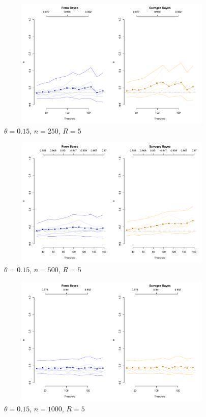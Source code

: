 \documentclass[12pt]{article}
\begin{document}
\begin{figure}
\begin{center}
\includegraphics[width=5.5in, height=2.45in]{../extremal_comparison/figs/sim_frechet_hier_15_250_5.pdf}
\caption{$\theta=0.15$, $n=250$, $R=5$}
\end{center}
\end{figure}

\begin{figure}
\begin{center}
\includegraphics[width=5.5in, height=2.45in]{../extremal_comparison/figs/sim_frechet_hier_15_500_5.pdf}
\caption{$\theta=0.15$, $n=500$, $R=5$}
\end{center}
\end{figure}

\begin{figure}
\begin{center}
\includegraphics[width=5.5in, height=2.45in]{../extremal_comparison/figs/sim_frechet_hier_15_1000_5.pdf}
\caption{$\theta=0.15$, $n=1000$, $R=5$}
\end{center}
\end{figure}
\end{document}
